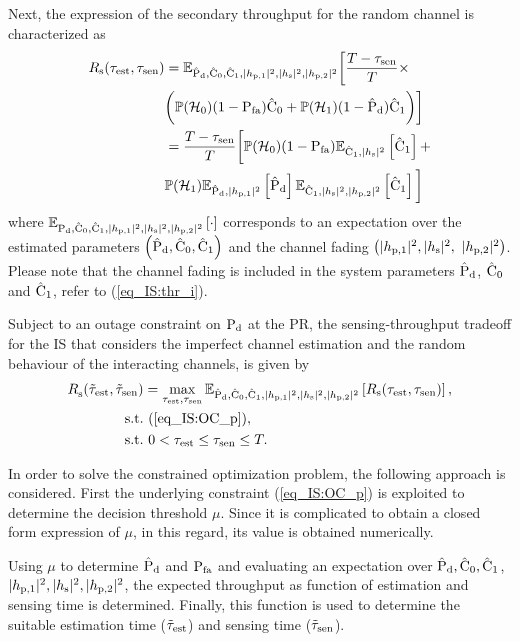 Next, the expression of the secondary throughput for the random channel is characterized as 
\begin{align}
\rs(\test, \tsen) &= \mathbb{E}_{\epd,\ecz,\eco,\phpo, \phs, \phpt} \bigg[ \frac{T - \tsen}{T} \times \nonumber \\ & \bigg( \phz (1 - \pfa) \ecz + \pho (1 -\epd) \eco \bigg) \bigg] \label{eq_IS:thr_p} \\
  \quad &= \frac{T - \tsen}{T} \bigg[ \phz (1 - \pfa) \e{\eco, \phs}{\eco} + \nonumber \\ & \pho \e{\epd, \phpo}{\epd} \e{\eco, \phs, \phpt}{\eco} \bigg] \nonumber 
\end{align}
where $\e{\pd,\ecz,\eco,\phpo, \phs, \phpt}{\cdot}$ corresponds to an expectation over the estimated parameters $\left( \epd, \ecz, \eco \right)$ and the channel fading $\big(\phpo, \phs,$ $\phpt \big)$. Please note that the channel fading is included in the system parameters $\epd$, $\ecz$ and $\eco$, refer to (\ref{eq_IS:thr_i}).

\begin{theorem} \label{th_IS:th4}
\normalfont
Subject to an outage constraint on $\pd$ at the PR, the sensing-throughput tradeoff for the IS that considers the imperfect channel estimation and the random behaviour of the interacting channels, is given by
\begin{align}
\trsoc(\ttest, \ttsen) &= \maxi_{\tc{\test}, \tsen} \e{\epd, \ecz, \eco, \phpo, \phs, \phpt}{\rs(\test, \tsen)}, \nonumber \\ 
\text{s.t.} & \text{ }  (\ref{eq_IS:OC_p}),  \\
\tc{\text{s.t.}} & \text{ }  \tc{0 < \test \le \tsen \le T.} \nonumber
\end{align}
\end{theorem}

\begin{IEEEproof}
In order to solve the constrained optimization problem, the following approach is considered. First the underlying constraint (\ref{eq_IS:OC_p}) is exploited to determine the decision threshold $\mu$. Since it is complicated to obtain a closed form expression of $\mu$, in this regard, its value is obtained numerically.

Using $\mu$ to determine $\epd$ and $\pfa$ and evaluating an expectation over $\epd, \ecz, \eco$, $\phpo, \phs, \phpt$, the expected throughput as function of estimation and sensing time is determined. Finally, this function is used to determine the suitable estimation time ($\ttest$) and sensing time ($\ttsen$).
\end{IEEEproof}


